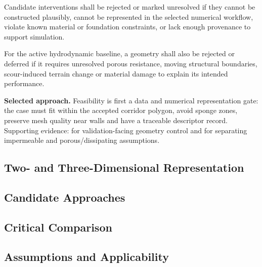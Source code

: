 Candidate interventions shall be rejected or marked unresolved if they cannot
be constructed plausibly, cannot be represented in the selected numerical
workflow, violate known material or foundation constraints, or lack enough
provenance to support simulation.

For the active hydrodynamic baseline, a geometry shall also be rejected
or deferred if it requires unresolved porous resistance, moving
structural boundaries, scour-induced terrain change or material
damage to explain its intended performance.

\textbf{Selected approach.} Feasibility is first a data and numerical
representation gate: the case must fit within the accepted corridor
polygon, avoid sponge zones, preserve mesh quality near walls and have
a traceable descriptor record. Supporting evidence:
\textcite{watanabe2022validation} for validation-facing geometry
control and \textcite{deljesus2012porous} for separating impermeable
and porous/dissipating assumptions.

\subsection{Two- and Three-Dimensional Representation}
\label{sec:res-geo-cst-two-three-dimensional-representation}


\subsection{Candidate Approaches}
\label{sec:res-geo-cst-candidate-approaches}


\subsection{Critical Comparison}
\label{sec:res-geo-cst-critical-comparison}


\subsection{Assumptions and Applicability}
\label{sec:res-geo-cst-assumptions}


